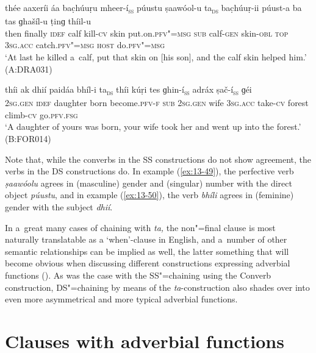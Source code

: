 \begin{exe}
\ex
\label{ex:13-49}
\gll thée aaxeríi {\ob}áa bac̣húuṛu mheer-í{\cb}\textsc{\textsubscript{ss}} {\ob}púustu ṣaawóol-u ta{\cb}\textsc{\textsubscript{ds}} bac̣húuṛ-ii púust-a ba tas ɡhašíl-u ṭinɡ thíil-u \\
then finally \textsc{idef} calf kill-\textsc{cv}  skin  put.on.\textsc{pfv"=msg} \textsc{sub} calf-\textsc{gen} skin-\textsc{obl} \textsc{top} \textsc{3sg.acc}
catch.\textsc{pfv"=msg} \textsc{host} do.\textsc{pfv"=msg} \\
\glt `At last he killed a~calf, put that skin on [his son], and the calf skin helped him.' (A:DRA031)

\ex
\label{ex:13-50}
\gll {\ob}thíi ak dhií paidáa bhíl-i ta{\cb}\textsc{\textsubscript{ds}} {\ob}thíi kúṛi tes ɡhin-í{\cb}\textsc{\textsubscript{ss}} {\ob}adráx ṣač-í{\cb}\textsc{\textsubscript{ss}} ɡéi \\
\textsc{2sg.gen} \textsc{idef} daughter born become.\textsc{pfv-f} \textsc{sub} \textsc{2sg.gen}  wife \textsc{3sg.acc} take-\textsc{cv} forest climb-\textsc{cv} go.\textsc{pfv.fsg} \\
\glt `A daughter of yours was born, your wife took her and went up into the forest.' (B:FOR014) 
\end{exe}

Note that, while the converbs in the SS constructions do not show agreement, the verbs in the DS constructions do. In example (\ref{ex:13-49}), the perfective verb \textit{ṣaawóolu} agrees in (masculine) gender and (singular) number with the direct object \textit{púustu}, and in example (\ref{ex:13-50}), the verb \textit{bhíli} agrees in (feminine) gender with the subject \textit{dhií}. 


In a~great many cases of chaining with \textit{ta,} the non"=final clause is most naturally translatable as a `when'-clause in English, and a~number of other semantic relationships can be implied as well, the latter something that will become obvious when discussing different constructions expressing adverbial functions (). As was the case with the SS"=chaining using the Converb construction, DS"=chaining by means of the \textit{ta}-construction also shades over into even more asymmetrical and more typical adverbial functions. 


\section{Clauses with adverbial functions}
\label{sec:13-4}

